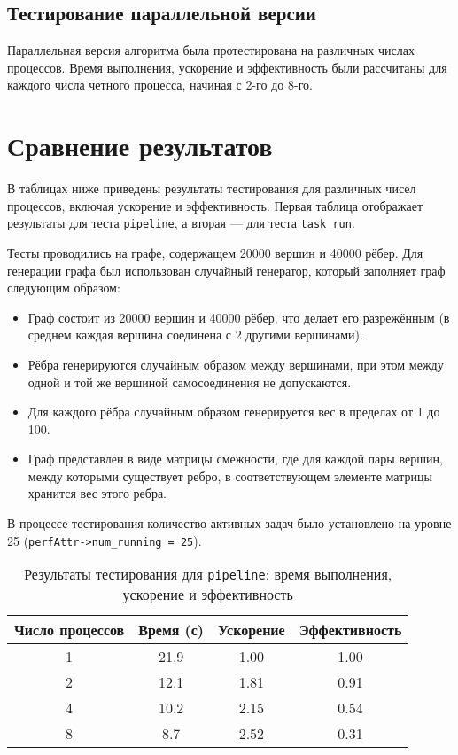 \documentclass[a4paper,14pt]{extarticle}
\begin{document}
\subsection*{Тестирование параллельной версии}

Параллельная версия алгоритма была протестирована на различных числах процессов. Время выполнения, ускорение и эффективность были рассчитаны для каждого числа четного процесса, начиная с 2-го до 8-го.
\section*{Сравнение результатов}

В таблицах ниже приведены результаты тестирования для различных чисел процессов, включая ускорение и эффективность. Первая таблица отображает результаты для теста \texttt{pipeline}, а вторая — для теста \texttt{task\_run}.

Тесты проводились на графе, содержащем 20000 вершин и 40000 рёбер. Для генерации графа был использован случайный генератор, который заполняет граф следующим образом:

\begin{itemize}
    \item Граф состоит из 20000 вершин и 40000 рёбер, что делает его разрежённым (в среднем каждая вершина соединена с 2 другими вершинами).
    \item Рёбра генерируются случайным образом между вершинами, при этом между одной и той же вершиной самосоединения не допускаются.
    \item Для каждого рёбра случайным образом генерируется вес в пределах от 1 до 100.
    \item Граф представлен в виде матрицы смежности, где для каждой пары вершин, между которыми существует ребро, в соответствующем элементе матрицы хранится вес этого ребра.
\end{itemize}

В процессе тестирования количество активных задач было установлено на уровне 25 (\texttt{perfAttr->num\_running = 25}).

\begin{table}[h!]
\centering
\setlength{\tabcolsep}{3pt} %
\small
\begin{tabular}{|c|c|c|c|}  
\hline
\textbf{Число процессов} & \textbf{Время  (с)} & \textbf{Ускорение } & \textbf{Эффективность } \\ \hline
1 & 21.9 & 1.00 & 1.00 \\ \hline
2 & 12.1 & 1.81 & 0.91 \\ \hline
4 & 10.2 & 2.15 & 0.54 \\ \hline
8 & 8.7 & 2.52 & 0.31 \\ \hline
\end{tabular}
\caption{Результаты тестирования для \texttt{pipeline}: время выполнения, ускорение и эффективность}
\end{table}
\vspace*{-1cm} %
\end{document}
